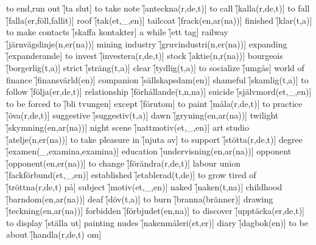 \begin{questions}
\begin{multicols}{2}
        \question to end,run out \f[ta slut]
        \question to take note \f[anteckna(r,de,t)]
        \question to call \f[kalla(r,de,t)]
        \question to fall \f[falla(er,föll,fallit)]
        \question roof \f[tak(et,\_,en)]
        \question tailcoat \f[frack(en,ar(na))]
        \question finished \f[klar(t,a)]
        \question to make contacts \f[skaffa kontakter]
        \question a while \f[ett tag]
        \question railway \f[järnvägslinje(n,er(na))]
        \question mining industry \f[gruvindustri(n,er(na))]
        \question expanding \f[expanderande]
        \question to invest \f[investera(r,de,t)]
        \question stock \f[aktie(n,r(na))]
        \question bourgeois \f[borgerlig(t,a)]
        \question strict \f[sträng(t,a)]
        \question clear \f[tydlig(t,a)]
        \question to socialize \f[umgås]
        \question world of finance \f[finansvärld(en)]
        \question companion \f[sällskapsdam(en)]
        \question shameful \f[skamlig(t,a)]
        \question to follow \f[följa(er,de,t)]
        \question relationship \f[förhållande(t,n,na)]
        \question suicide \f[självmord(et,\_,en)]
        \question to be forced to \f[bli tvungen]
        \question except \f[förutom]
        \question to paint \f[måla(r,de,t)]
        \question to practice \f[öva(r,de,t)]
        \question suggestive \f[suggestiv(t,a)]
        \question dawn \f[gryning(en,ar(na))]
        \question twilight \f[skymning(en,ar(na))]
        \question night scene \f[nattmotiv(et,\_,en)]
        \question art studio \f[atelje(n,er(na))]
        \question to take pleasure in \f[njuta av]
        \question to support \f[stötta(r,de,t)]
        \question degree \f[examen(\_,examina,examina)]
        \question education \f[undervisning(en,ar(na))]
        \question opponent \f[opponent(en,er(na))]
        \question to change \f[förändra(r,de,t)]
        \question labour union \f[fackförbund(et,\_,en)]
        \question established \f[etablerad(t,de)]
        \question to grow tired of \f[tröttna(r,de,t) på]
        \question subject \f[motiv(et,\_,en)]
        \question naked \f[naken(t,na)]
        \question childhood \f[barndom(en,ar(na))]
        \question deaf \f[döv(t,a)]
        \question to burn \f[branna(bränner)]
        \question drawing \f[teckning(en,ar(na))]
        \question forbidden \f[förbjudet(en,na)]
        \question to discover \f[upptäcka(er,de,t)]
        \question to display \f[ställa ut]
        \question painting nudes \f[nakenmåleri(et,er)]
        \question diary \f[dagbok(en)]
        \question to be about \f[handla(r,de,t) om]

\end{multicols}
\end{questions}
